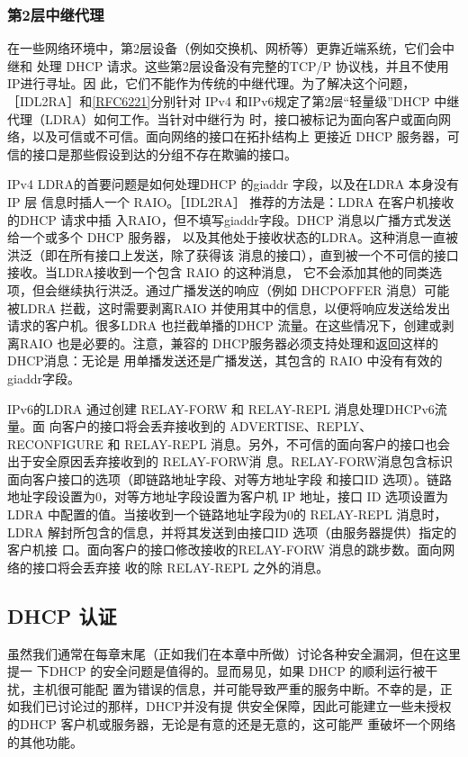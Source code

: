 \subsubsection{第2层中继代理}
在一些网络环境中，第2层设备（例如交换机、网桥等）更靠近端系统，它们会中继和
处理 DHCP 请求。这些第2层设备没有完整的TCP/P 协议栈，并且不使用IP进行寻址。因
此，它们不能作为传统的中继代理。为了解决这个问题，［IDL2RA］和\href{https://www.rfc-editor.org/rfc/rfc6221}{\href{https://www.rfc-editor.org/rfc/rfc6221}{[RFC6221]}}分别针对
IPv4 和IPv6规定了第2层“轻量级”DHCP 中继代理（LDRA）如何工作。当针对中继行为
时，接口被标记为面向客户或面向网络，以及可信或不可信。面向网络的接口在拓扑结构上
更接近 DHCP 服务器，可信的接口是那些假设到达的分组不存在欺骗的接口。

IPv4 LDRA的首要问题是如何处理DHCP 的giaddr 字段，以及在LDRA 本身没有IP 层
信息时插人一个 RAIO。［IDL2RA］ 推荐的方法是：LDRA 在客户机接收的DHCP 请求中插
入RAIO，但不填写giaddr字段。DHCP 消息以广播方式发送给一个或多个 DHCP 服务器，
以及其他处于接收状态的LDRA。这种消息一直被洪泛（即在所有接口上发送，除了获得该
消息的接口），直到被一个不可信的接口接收。当LDRA接收到一个包含 RAIO 的这种消息，
它不会添加其他的同类选项，但会继续执行洪泛。通过广播发送的响应（例如 DHCPOFFER
消息）可能被LDRA 拦截，这时需要剥离RAIO 并使用其中的信息，以便将响应发送给发出
请求的客户机。很多LDRA 也拦截单播的DHCP 流量。在这些情况下，创建或剥离RAIO
也是必要的。注意，兼容的 DHCP服务器必须支持处理和返回这样的DHCP消息：无论是
用单播发送还是广播发送，其包含的 RAIO 中没有有效的giaddr字段。

IPv6的LDRA 通过创建 RELAY-FORW 和 RELAY-REPL 消息处理DHCPv6流量。面
向客户的接口将会丢弃接收到的 ADVERTISE、REPLY、RECONFIGURE 和 RELAY-REPL
消息。另外，不可信的面向客户的接口也会出于安全原因丢弃接收到的 RELAY-FORW消
息。RELAY-FORW消息包含标识面向客户接口的选项（即链路地址字段、对等方地址字段
和接口ID 选项）。链路地址字段设置为0，对等方地址字段设置为客户机 IP 地址，接口 ID
选项设置为LDRA 中配置的值。当接收到一个链路地址字段为0的 RELAY-REPL 消息时，
LDRA 解封所包含的信息，并将其发送到由接口ID 选项（由服务器提供）指定的客户机接
口。面向客户的接口修改接收的RELAY-FORW 消息的跳步数。面向网络的接口将会丢弃接
收的除 RELAY-REPL 之外的消息。

\subsection{DHCP 认证}
虽然我们通常在每章末尾（正如我们在本章中所做）讨论各种安全漏洞，但在这里提一
下DHCP 的安全问题是值得的。显而易见，如果 DHCP 的顺利运行被干扰，主机很可能配
置为错误的信息，并可能导致严重的服务中断。不幸的是，正如我们已讨论过的那样，DHCP并没有提
供安全保障，因此可能建立一些未授权的DHCP 客户机或服务器，无论是有意的还是无意的，这可能严
重破坏一个网络的其他功能。

